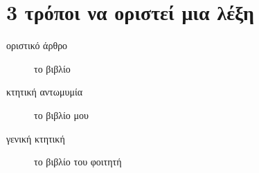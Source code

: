 \section*{3 τρόποι να οριστεί μια λέξη}

\begin{description}
\item[οριστικό άρθρο ] το βιβλίο 
\item[κτητική αντωμυμία] το βιβλίο μου 
\item[γενική κτητική] το βιβλίο του φοιτητή 
\end{description}
